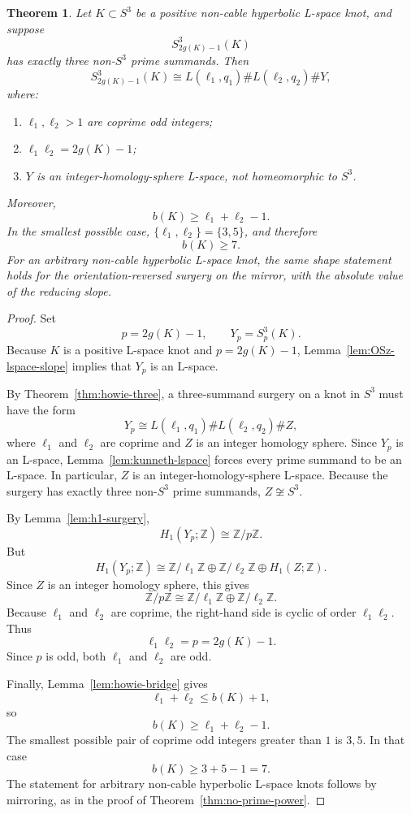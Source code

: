 \documentclass[12pt]{article}
\newtheorem{theorem}{Theorem}[section]
\theoremstyle{definition}
\newcommand{\Z}{\mathbb Z}
\begin{document}
\begin{theorem}\label{thm:residual-shape}
Let \(K\subset S^3\) be a positive non-cable hyperbolic L-space knot, and suppose
\[
S^3_{2g(K)-1}(K)
\]
has exactly three non-\(S^3\) prime summands.  Then
\[
S^3_{2g(K)-1}(K)
\cong
L(\ell_1,q_1)\# L(\ell_2,q_2)\# Y,
\]
where:
\begin{enumerate}
  \item \(\ell_1,\ell_2>1\) are coprime odd integers;
  \item \(\ell_1\ell_2=2g(K)-1\);
  \item \(Y\) is an integer-homology-sphere L-space, not homeomorphic to \(S^3\).
\end{enumerate}
Moreover,
\[
b(K)\ge \ell_1+\ell_2-1.
\]
In the smallest possible case, \(\{\ell_1,\ell_2\}=\{3,5\}\), and therefore
\[
b(K)\ge 7.
\]
For an arbitrary non-cable hyperbolic L-space knot, the same shape statement holds for the orientation-reversed surgery on the mirror, with the absolute value of the reducing slope.
\end{theorem}

\begin{proof}
Set
\[
p=2g(K)-1,\qquad Y_p=S^3_p(K).
\]
Because \(K\) is a positive L-space knot and \(p=2g(K)-1\), Lemma~\ref{lem:OSz-lspace-slope} implies that \(Y_p\) is an L-space.

By Theorem~\ref{thm:howie-three}, a three-summand surgery on a knot in \(S^3\) must have the form
\[
Y_p\cong L(\ell_1,q_1)\# L(\ell_2,q_2)\# Z,
\]
where \(\ell_1\) and \(\ell_2\) are coprime and \(Z\) is an integer homology sphere.  Since \(Y_p\) is an L-space, Lemma~\ref{lem:kunneth-lspace} forces every prime summand to be an L-space.  In particular, \(Z\) is an integer-homology-sphere L-space.  Because the surgery has exactly three non-\(S^3\) prime summands, \(Z\not\cong S^3\).

By Lemma~\ref{lem:h1-surgery},
\[
H_1(Y_p;\Z)\cong \Z/p\Z.
\]
But
\[
H_1(Y_p;\Z)\cong
\Z/\ell_1\Z\oplus \Z/\ell_2\Z\oplus H_1(Z;\Z).
\]
Since \(Z\) is an integer homology sphere, this gives
\[
\Z/p\Z\cong \Z/\ell_1\Z\oplus \Z/\ell_2\Z.
\]
Because \(\ell_1\) and \(\ell_2\) are coprime, the right-hand side is cyclic of order \(\ell_1\ell_2\).  Thus
\[
\ell_1\ell_2=p=2g(K)-1.
\]
Since \(p\) is odd, both \(\ell_1\) and \(\ell_2\) are odd.

Finally, Lemma~\ref{lem:howie-bridge} gives
\[
\ell_1+\ell_2\le b(K)+1,
\]
so
\[
b(K)\ge \ell_1+\ell_2-1.
\]
The smallest possible pair of coprime odd integers greater than \(1\) is \(3,5\).  In that case
\[
b(K)\ge 3+5-1=7.
\]
The statement for arbitrary non-cable hyperbolic L-space knots follows by mirroring, as in the proof of Theorem~\ref{thm:no-prime-power}.
\end{proof}
\end{document}
